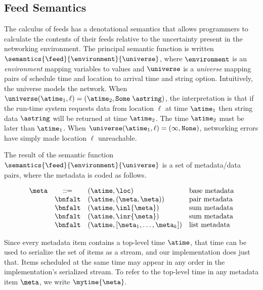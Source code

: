%

\subsection{Feed Semantics}

The calculus of feeds has a denotational semantics that allows
programmers to calculate the contents of their feeds relative to
the uncertainty present in the networking environment.  The
principal semantic function is written
$\semantics{\feed}{\environment}{\universe}$,
where  $\environment$ is an {\em environment} mapping variables to values
and $\universe$ is a {\em universe} mapping pairs of
schedule time and location to arrival time and string option.
Intuitively, the universe models the network.
When $\universe (\atime_1, \ell) = (\atime_2, \mathtt{Some} \; \astring)$,
 the interpretation is that if the run-time system requests data
from location $\ell$ at time $\atime_1$ then string data $\astring$
will be returned at time $\atime_2$.  The time $\atime_2$ must be
later than $\atime_1$.
When $\universe (\atime_1, \ell) = (\infty, \mathtt{None})$,
networking errors have simply made location $\ell$ unreachable.

The result of the semantic function 
$\semantics{\feed}{\environment}{\universe}$
is a set of metadata/data pairs, where the 
metadata is coded as follows.

\[
\begin{array}{lcll} 
\meta & ::=     
& (\atime,\loc) & \mbox{base metadata} \\
& \bnfalt & (\atime,(\meta,\meta)) & \mbox{pair metadata} \\
& \bnfalt & (\atime,\inl{\meta}) & \mbox{sum metadata} \\
& \bnfalt & (\atime,\inr{\meta}) & \mbox{sum metadata} \\
& \bnfalt & (\atime,[\meta_1,\ldots,\meta_k]) & \mbox{list metadata} \\
\end{array}
\]  

Since every metadata item contains a top-level time $\atime$, that
time can be used to serialize the set of items as a stream, and 
our implementation does just that.  Items scheduled at the
same time may appear in any order in the implementation's
serialized stream.  To refer to the top-level time in any metadata
item $\meta$, we write $\mytime{\meta}$. 

